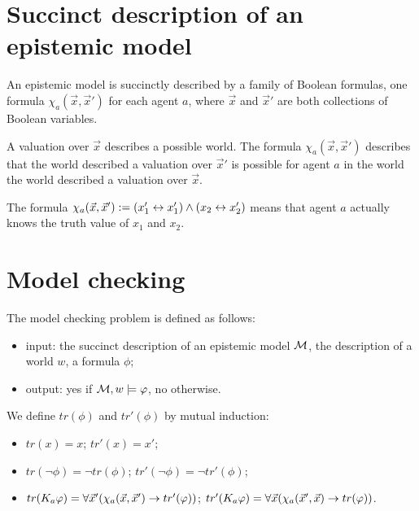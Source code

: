 \documentclass{article}
\begin{document}

\section{Succinct description of an epistemic model}

\begin{definition}
An epistemic model is succinctly described by a family of Boolean formulas, one formula $\chi_a(\vec x, \vec x')$ for each agent $a$, where $\vec x$ and $\vec x'$ are both collections of Boolean variables.
\end{definition}

A valuation over $\vec x$ describes a possible world. The formula $\chi_a(\vec x, \vec x')$ describes that the world described a valuation over $\vec x'$ is possible for agent $a$ in the world  the world described a valuation over $\vec x$. 




\begin{example}
	The formula
	$\chi_a(\vec x, \vec x') := (x_1' \leftrightarrow x_1') \land (x_2 \leftrightarrow x_2')$ means that agent $a$ actually knows the truth value of $x_1$ and $x_2$.
\end{example}






\section{Model checking}

The model checking problem is defined as follows:
\begin{itemize}
	\item input: the succinct description of an epistemic model $\mathcal M$, the description of a world $w$, a formula $\phi$;
	\item output: yes if $\mathcal M, w \models \varphi$, no otherwise.
\end{itemize}


\newcommand\trmltoqbf[2]{tr#1(#2)}

\begin{definition}
	\label{definition:trmltoqbf}
	We define $\trmltoqbf{}{\phi}$ and $
	\trmltoqbf{'}{\phi}$ by mutual induction:
	
	\begin{itemize}
		\item $\trmltoqbf{}{x} = x$; $\trmltoqbf{'}{x} = x'$;
		\item $\trmltoqbf{}{\lnot \phi} = \lnot \trmltoqbf{}{\phi}$; $\trmltoqbf{'}{\lnot \phi} = \lnot \trmltoqbf{'}{\phi}$;
		
		
		\item $\trmltoqbf{}{K_a \phi} = \forall \vec x' (\chi_a(\vec x, \vec x') \limply  \trmltoqbf{'}{\phi})$; 	 $\trmltoqbf{'}{K_a \phi} = \forall \vec x (\chi_a(\vec x', \vec x) \limply  \trmltoqbf{}{\phi})$.
		
	\end{itemize}
	
\end{definition}
\end{document}
